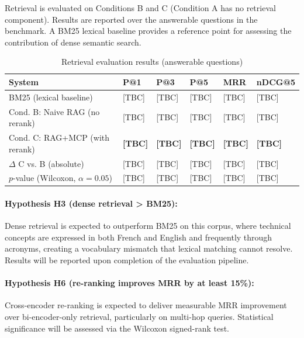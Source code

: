 Retrieval is evaluated on Conditions B and C (Condition A has no retrieval component). Results are reported over the answerable questions in the benchmark. A BM25 lexical baseline \citep{Robertson2009BM25} provides a reference point for assessing the contribution of dense semantic search.

\begin{table}[H]
\centering
\caption{Retrieval evaluation results (answerable questions)}
\label{tab:retrieval-results}
\begin{tabularx}{\textwidth}{@{}lXXXXX@{}}
\toprule
\textbf{System} & \textbf{P@1} & \textbf{P@3} & \textbf{P@5} & \textbf{MRR} & \textbf{nDCG@5} \\
\midrule
BM25 (lexical baseline) & [TBC] & [TBC] & [TBC] & [TBC] & [TBC] \\
Cond. B: Naive RAG (no rerank) & [TBC] & [TBC] & [TBC] & [TBC] & [TBC] \\
Cond. C: RAG+MCP (with rerank) & \textbf{[TBC]} & \textbf{[TBC]} & \textbf{[TBC]} & \textbf{[TBC]} & \textbf{[TBC]} \\
\midrule
$\Delta$ C vs. B (absolute) & [TBC] & [TBC] & [TBC] & [TBC] & [TBC] \\
$p$-value (Wilcoxon, $\alpha=0.05$) & [TBC] & [TBC] & [TBC] & [TBC] & [TBC] \\
\bottomrule
\end{tabularx}
\end{table}


\paragraph{Hypothesis H3 (dense retrieval > BM25):} Dense retrieval is expected to outperform BM25 on this corpus, where technical concepts are expressed in both French and English and frequently through acronyms, creating a vocabulary mismatch that lexical matching cannot resolve. Results will be reported upon completion of the evaluation pipeline.

\paragraph{Hypothesis H6 (re-ranking improves MRR by at least 15\%):} Cross-encoder re-ranking is expected to deliver measurable MRR improvement over bi-encoder-only retrieval, particularly on multi-hop queries. Statistical significance will be assessed via the Wilcoxon signed-rank test.

